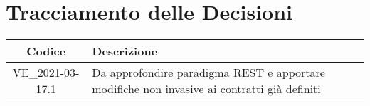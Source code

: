 \section*{Tracciamento delle Decisioni}

\begin{center}
	\begin{longtable}{|c|p{12.5cm}|}
	\hline
	\rowcolor{lighter-grayer}
	\textbf{Codice} & \textbf{Descrizione} \\
	\hline
	\endfirsthead
	\hline
	VE\_2021-03-17.1 & Da approfondire paradigma REST e apportare modifiche non invasive ai contratti già definiti \\
	\hline

	\end{longtable}
\end{center}
